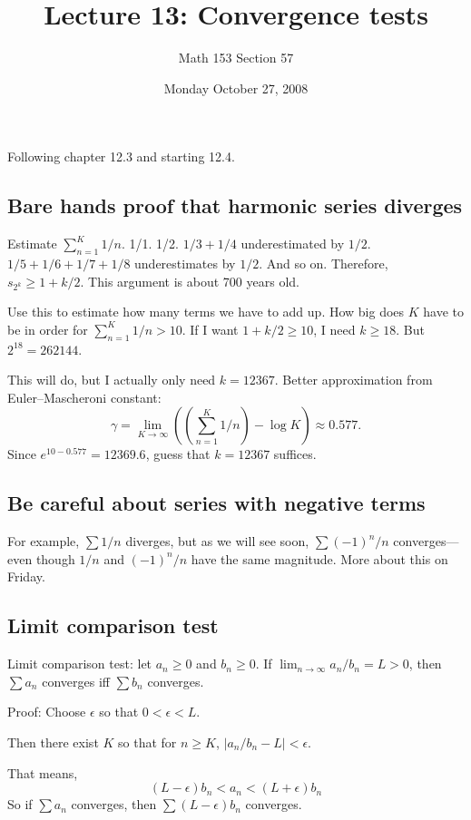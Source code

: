 \documentclass[12pt]{article}
\title{Lecture 13: Convergence tests}
\author{Math 153 Section 57}
\date{Monday October 27, 2008}
\begin{document}
\maketitle

Following chapter 12.3 and starting 12.4.

\subsection*{Bare hands proof that harmonic series diverges}

Estimate $\sum_{n = 1}^K 1/n$.  1/1.  1/2.  $1/3 + 1/4$ underestimated
by $1/2$.  $1/5 +1/6 + 1/7 + 1/8$ underestimates by $1/2$.  And so on.
Therefore, $s_{2^k} \geq 1 + k/2$.  This argument is about 700 years
old.

Use this to estimate how many terms we have to add up.  How big does
$K$ have to be in order for $\sum_{n=1}^K 1/n > 10$.  If I want $1 +
k/2 \geq 10$, I need $k \geq 18$.  But $2^{18} = 262144$.

This will do, but I actually only need $k = 12367$.  Better
approximation from Euler–Mascheroni constant:
$$
\gamma = \lim_{K \to \infty} \left(\left( \sum_{n=1}^K 1/n \right) - \log K\right) \approx 0.577.
$$
Since $e^{10 - 0.577} = 12369.6$, guess that $k = 12367$ suffices.

\subsection*{Be careful about series with negative terms}

For example, $\sum 1/n$ diverges, but as we will see soon, $\sum
(-1)^n/n$ converges---even though $1/n$ and $(-1)^n/n$ have the same
magnitude.  More about this on Friday.

\subsection*{Limit comparison test}

Limit comparison test: let $a_n \geq 0$ and $b_n \geq 0$.  If $\lim_{n \to \infty} a_n / b_n = L > 0$, then $\sum a_n$ converges iff $\sum b_n$ converges.

Proof: Choose $\epsilon$ so that $0 < \epsilon < L$.

Then there exist $K$ so that for $n \geq K$, $|a_n / b_n - L| < \epsilon$.

That means,
$$
(L - \epsilon) b_n < a_n < (L + \epsilon) b_n
$$
So if $\sum a_n$ converges, then $\sum (L - \epsilon) b_n$ converges.
\end{document}
